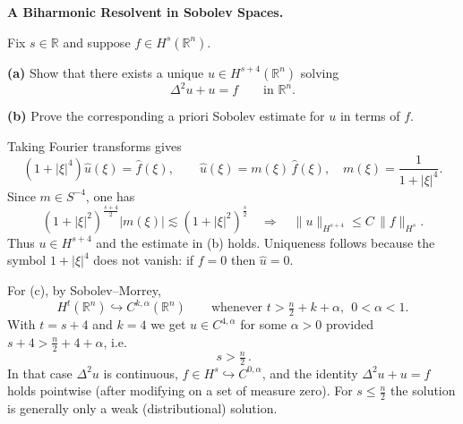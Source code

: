 \begin{problem}[CP-II-0117]
\label{prob:cp-ii-0117}
\textbf{A Biharmonic Resolvent in Sobolev Spaces.}

\hspace*{1.5em}Fix \(s\in\mathbb R\) and suppose \(f\in H^s(\mathbb R^n)\).

\par\smallskip\noindent\textbf{(a)}\quad
Show that there exists a unique \(u\in H^{s+4}(\mathbb R^n)\) solving
\[
\Delta^2u+u=f
\qquad\text{in }\mathbb R^n.
\]

\par\smallskip\noindent\textbf{(b)}\quad
Prove the corresponding a priori Sobolev estimate for \(u\) in terms of \(f\).
\end{problem}

\begin{solution}
Taking Fourier transforms gives
\[
(1+|\xi|^4)\widehat u(\xi)=\widehat f(\xi),\qquad
\widehat u(\xi)=m(\xi)\,\widehat f(\xi),\quad m(\xi)=\frac{1}{1+|\xi|^4}.
\]
Since $m\in S^{-4}$, one has
\[
(1+|\xi|^2)^{\frac{s+4}{2}}|m(\xi)| \lesssim (1+|\xi|^2)^{\frac{s}{2}}
\quad\Rightarrow\quad
\|u\|_{H^{s+4}}\le C\,\|f\|_{H^s}.
\]
Thus $u\in H^{s+4}$ and the estimate in (b) holds. Uniqueness follows because the symbol $1+|\xi|^4$ does not vanish:
if $f=0$ then $\widehat u=0$.

\medskip
For (c), by Sobolev--Morrey,
\[
H^{t}(\mathbb R^n)\hookrightarrow C^{k,\alpha}(\mathbb R^n)\qquad\text{whenever }t>\tfrac n2+k+\alpha,\ \ 0<\alpha<1.
\]
With $t=s+4$ and $k=4$ we get $u\in C^{4,\alpha}$ for some $\alpha>0$ provided $s+4>\frac n2+4+\alpha$, i.e.
\[
\boxed{\,s>\tfrac n2\,}.
\]
In that case $\Delta^2 u$ is continuous, $f\in H^s\hookrightarrow C^{0,\alpha}$, and the identity
$\Delta^2 u+u=f$ holds pointwise (after modifying on a set of measure zero).
For $s\le\tfrac n2$ the solution is generally only a weak (distributional) solution.
\end{solution}

